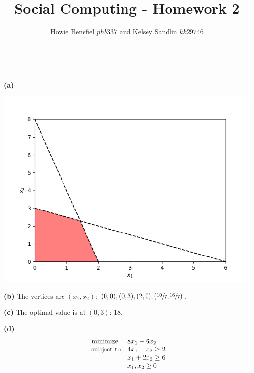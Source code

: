 \documentclass[12pt]{article}
\newenvironment{problem}[2][Problem]{\begin{trivlist}
\item[\hskip \labelsep {\bfseries #1}\hskip \labelsep {\bfseries #2.}]}{\end{trivlist}}
\newenvironment{subproblem}[1]{\textbf{(#1)}}{}
\theoremstyle{definition}
\begin{document}

\title{Social Computing - Homework 2}
\author{Howie Benefiel \(phb337\) and Kelsey Sandlin \(kk29746\) }
\maketitle

\begin{problem}{1}
$ $ \newline

\begin{subproblem}{a}

\includegraphics[width=\textwidth]{feasibleq1.png}
\end{subproblem}

\begin{subproblem}{b}
The vertices are $(x_1, x_2)$: $(0, 0), (0, 3), (2, 0), (\sfrac{10}{7}, \sfrac{16}{7})$.
\end{subproblem}

\begin{subproblem}{c}
The optimal value is at $(0, 3)$: 18.
\end{subproblem}

\begin{subproblem}{d}
\begin{equation*}
\begin{array}{ll@{}ll}
\text{minimize}  & 8x_1 + 6x_2 \\
\text{subject to}& 4x_1+x_2 \geq 2\\
                 & x_1 + 2x_2 \geq 6\\
                 & x_1, x_2 \geq 0


\end{array}
\end{equation*}
\end{subproblem}
\end{problem}
\end{document}
